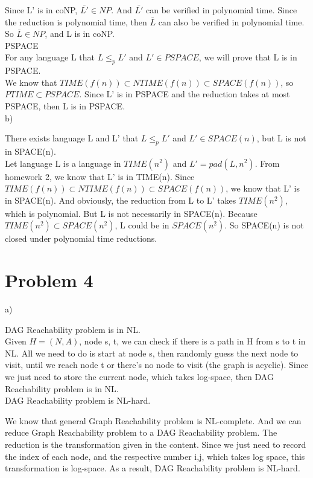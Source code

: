 \documentclass[12pt]{article}
\begin{document}
Since L' is in coNP, $\bar {L'} \in NP$. And $\bar {L'}$ can be
verified in polynomial time. Since the reduction is polynomial time,
then $\bar {L}$ can also be verified in polynomial time. So $\bar {L}
\in NP$, and L is in coNP. \\

PSPACE \\

For any language L that $L \le_p L'$ and $L' \in PSPACE$, we will
prove that L is in PSPACE. \\

We know that $TIME(f(n)) \subset NTIME(f(n)) \subset SPACE(f(n))$, so
$PTIME \subset PSPACE$. Since L' is in PSPACE and the reduction takes
at most PSPACE, then L is in PSPACE. \\

b)

There exists language L and L' that $L \le_p L'$ and $L' \in
SPACE(n)$, but L is not in SPACE(n). \\

Let language L is a language in $TIME(n^2)$ and $L' = pad(L,
n^2)$. From homework 2, we know that L' is in TIME(n). Since
$TIME(f(n)) \subset NTIME(f(n)) \subset SPACE(f(n))$, we know that L'
is in SPACE(n). And obviously, the reduction from L to L' takes
$TIME(n^2)$, which is polynomial. But L is not necessarily in
SPACE(n). Because $TIME(n^2) \subset SPACE(n^2)$, L could be in
$SPACE(n^2)$. So SPACE(n) is not closed under polynomial time
reductions.

\section*{Problem 4}

a)

DAG Reachability problem is in NL. \\

Given $H = (N,A)$, node s, t, we can check if there is a path in H
from s to t in NL. All we need to do is start at node s, then randomly
guess the next node to visit, until we reach node t or there's no node
to visit (the graph is acyclic). Since we just need to store the
current node, which takes log-space, then DAG Reachability problem is
in NL. \\

DAG Reachability problem is NL-hard.

We know that general Graph Reachability problem is NL-complete. And we
can reduce Graph Reachability problem to a DAG Reachability
problem. The reduction is the transformation given in the
content. Since we just need to record the index of each node, and the
respective number i,j, which takes log space, this transformation is
log-space. As a result, DAG Reachability problem is NL-hard. \\
\end{document}
